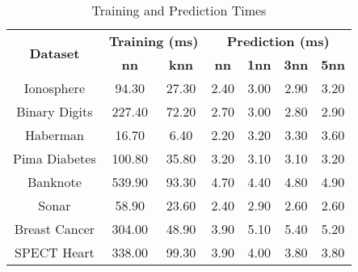 \begin{table}[htbp]
\caption{Training and Prediction Times}
\begin{center}
\begin{tabular}{|c|c|c|c|c|c|c|}
\hline
\multirow{2}{*}{\textbf{Dataset}} & \multicolumn{2}{c|}{\textbf{Training (ms)}} & \multicolumn{4}{c|}{\textbf{Prediction (ms)}} \\ \cline{2-7}
 & \textbf{nn} & \textbf{knn} & \textbf{nn} & \textbf{1nn} & \textbf{3nn} & \textbf{5nn} \\ \hline
Ionosphere & 94.30 & 27.30 & 2.40 & 3.00 & 2.90 & 3.20 \\ \hline
Binary Digits & 227.40 & 72.20 & 2.70 & 3.00 & 2.80 & 2.90 \\ \hline
Haberman & 16.70 & 6.40 & 2.20 & 3.20 & 3.30 & 3.60 \\ \hline
Pima Diabetes & 100.80 & 35.80 & 3.20 & 3.10 & 3.10 & 3.20 \\ \hline
Banknote & 539.90 & 93.30 & 4.70 & 4.40 & 4.80 & 4.90 \\ \hline
Sonar & 58.90 & 23.60 & 2.40 & 2.90 & 2.60 & 2.60 \\ \hline
Breast Cancer & 304.00 & 48.90 & 3.90 & 5.10 & 5.40 & 5.20 \\ \hline
SPECT Heart & 338.00 & 99.30 & 3.90 & 4.00 & 3.80 & 3.80 \\ \hline
\end{tabular}
\label{tab:timing}
\end{center}
\end{table}
